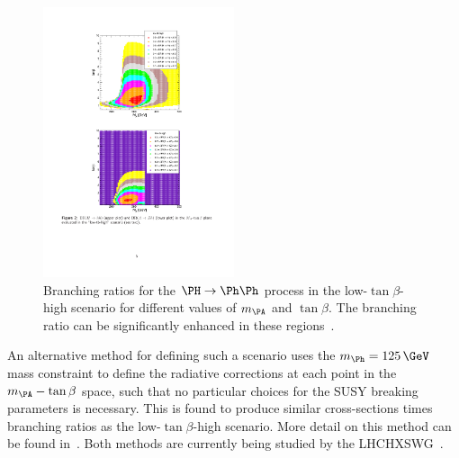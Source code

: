 \begin{figure}[htbp]
   \includegraphics[width=0.5\textwidth]{plots/theory/low-tanb-high-BR.pdf}
\caption[Branching ratios for the $\PH\to\Ph\Ph$ process in the low-$\tan\beta$-high
scenario for different values of $m_{\PA}$ and $\tan\beta$.]{
Branching ratios for the $\PH\to\Ph\Ph$ process in the low-$\tan\beta$-high
scenario for different values of $m_{\PA}$ and $\tan\beta$. The branching ratio
can be significantly enhanced in these regions~\cite{lowtanbhighwiki}.}
\label{fig:lowtanbhighBRs}
\end{figure}


An alternative method for defining such a scenario uses the $m_{\Ph}=125\,\GeV$
mass constraint to define the radiative corrections at each point in the
$m_{\PA}-\tan\beta$ space, such that no particular choices for the \ac{SUSY} breaking
parameters is necessary. This is found to produce similar cross-sections times
branching ratios as the low-$\tan\beta$-high scenario. More detail on this
method can be found in~\cite{Djouadi:2015jea}. Both methods are currently being studied by the 
\ac{LHCHXSWG}~\cite{LHCHiggsCrossSectionWorkingGroup:2011ti,Dittmaier:2012vm,Heinemeyer:2013tqa}. 



 



